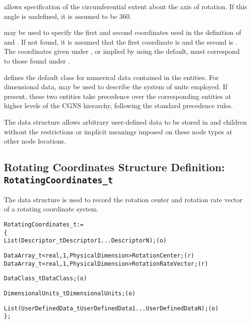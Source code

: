  allows specification of the circumferential
extent about the axis of rotation.
If this angle is undefined, it is assumed to be 360\degree.

 may be used to specify the first and second
coordinates used in the definition of 
and .
If not found, it is assumed that the first coordinate is
 and the second is .
The coordinates given under , or implied by
using the default, must correspond to those found under
.

 defines the default class for numerical data contained
in the  entities.
For dimensional data,  may be used to describe
the system of units employed.
If present, these two entities take precedence over the corresponding
entities at higher levels of the CGNS hierarchy, following the standard
precedence rules.

The  data structure allows arbitrary
user-defined data to be stored in  and
 children without the restrictions or implicit
meanings imposed on these node types at other node locations.

\subsection{Rotating Coordinates Structure Definition: \texttt{RotatingCoordinates\_t}}
\label{s:RotatingCoordinates}

The  data structure is used to record
the rotation center and rotation rate vector of a rotating coordinate
system.

\begin{alltt}
  RotatingCoordinates\_t :=
    \{
    List( Descriptor\_t Descriptor1 ... DescriptorN ) ;                      (o)

    DataArray\_t<real,1,PhysicalDimension> RotationCenter ;                  (r)
    DataArray\_t<real,1,PhysicalDimension> RotationRateVector ;              (r)

    DataClass\_t DataClass ;                                                 (o)

    DimensionalUnits\_t DimensionalUnits ;                                   (o)

    List( UserDefinedData\_t UserDefinedData1 ... UserDefinedDataN ) ;       (o)
    \} ;
\end{alltt}


